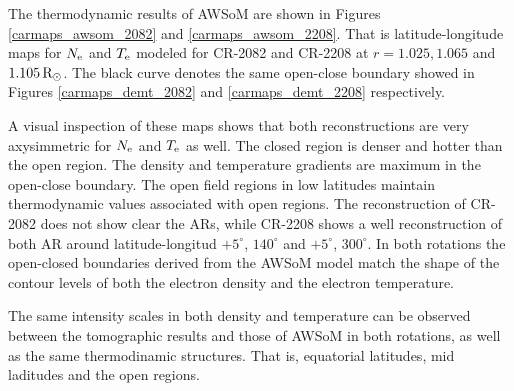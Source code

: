 \documentclass[namedreferences]{solarphysics}
\newcommand{\mdeg}{^\circ}
\newcommand{\mrsun}{{\rm R_\odot}}
\newcommand{\Te}{T_{\rm e}}
\newcommand{\Ne}{N_{\rm e}}
\def\diego#1{\textcolor{red}{#1}}
\begin{document}
\begin{article}
The thermodynamic results of AWSoM are shown in Figures \ref{carmaps_awsom_2082} and \ref{carmaps_awsom_2208}. That is latitude-longitude maps for $\Ne$ and $\Te$ modeled for CR-2082 and CR-2208 at $r=1.025, 1.065$ and $1.105\,\mrsun$. The black curve denotes the same open-close boundary showed in Figures \ref{carmaps_demt_2082} and \ref{carmaps_demt_2208} respectively.


A visual inspection of these maps shows that both reconstructions are very axysimmetric for $\Ne$ and $\Te$ as well. The closed region is denser and hotter than the open region. The density and temperature gradients are maximum in the open-close boundary. The open field regions in low latitudes maintain thermodynamic values associated with open regions. The reconstruction of CR-2082 does not show clear the ARs, while CR-2208 shows a well reconstruction of both AR around latitude-longitud $+5\mdeg$, $140\mdeg$ and $+5\mdeg$, $300\mdeg$. In both rotations the open-closed boundaries derived from the AWSoM model match the shape of the contour levels of both the electron density and the electron temperature.


The same intensity scales in both density and temperature can be observed between the tomographic results and those of AWSoM in both rotations, as well as the same thermodinamic structures. That is, equatorial latitudes, mid laditudes and the open regions.


\end{article}
\end{document}
